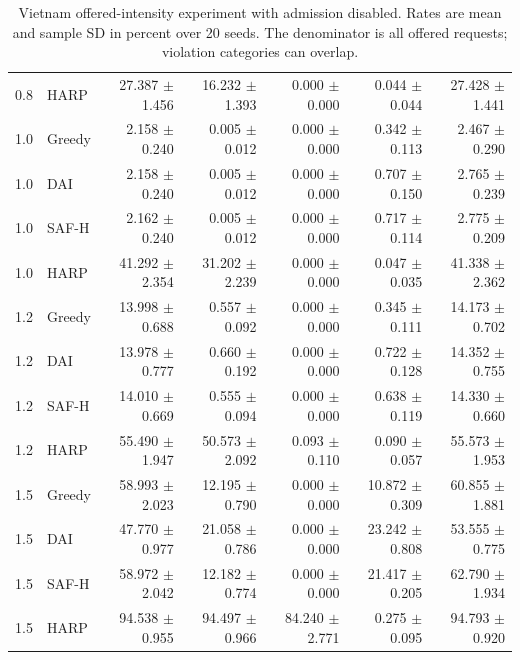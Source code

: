 \begin{table}[p]
\begin{tabular}{llrrrrr}
0.8 & HARP & 27.387 $\pm$ 1.456 & 16.232 $\pm$ 1.393 & 0.000 $\pm$ 0.000 & 0.044 $\pm$ 0.044 & 27.428 $\pm$ 1.441 \\
1.0 & Greedy & 2.158 $\pm$ 0.240 & 0.005 $\pm$ 0.012 & 0.000 $\pm$ 0.000 & 0.342 $\pm$ 0.113 & 2.467 $\pm$ 0.290 \\
1.0 & DAI & 2.158 $\pm$ 0.240 & 0.005 $\pm$ 0.012 & 0.000 $\pm$ 0.000 & 0.707 $\pm$ 0.150 & 2.765 $\pm$ 0.239 \\
1.0 & SAF-H & 2.162 $\pm$ 0.240 & 0.005 $\pm$ 0.012 & 0.000 $\pm$ 0.000 & 0.717 $\pm$ 0.114 & 2.775 $\pm$ 0.209 \\
1.0 & HARP & 41.292 $\pm$ 2.354 & 31.202 $\pm$ 2.239 & 0.000 $\pm$ 0.000 & 0.047 $\pm$ 0.035 & 41.338 $\pm$ 2.362 \\
1.2 & Greedy & 13.998 $\pm$ 0.688 & 0.557 $\pm$ 0.092 & 0.000 $\pm$ 0.000 & 0.345 $\pm$ 0.111 & 14.173 $\pm$ 0.702 \\
1.2 & DAI & 13.978 $\pm$ 0.777 & 0.660 $\pm$ 0.192 & 0.000 $\pm$ 0.000 & 0.722 $\pm$ 0.128 & 14.352 $\pm$ 0.755 \\
1.2 & SAF-H & 14.010 $\pm$ 0.669 & 0.555 $\pm$ 0.094 & 0.000 $\pm$ 0.000 & 0.638 $\pm$ 0.119 & 14.330 $\pm$ 0.660 \\
1.2 & HARP & 55.490 $\pm$ 1.947 & 50.573 $\pm$ 2.092 & 0.093 $\pm$ 0.110 & 0.090 $\pm$ 0.057 & 55.573 $\pm$ 1.953 \\
1.5 & Greedy & 58.993 $\pm$ 2.023 & 12.195 $\pm$ 0.790 & 0.000 $\pm$ 0.000 & 10.872 $\pm$ 0.309 & 60.855 $\pm$ 1.881 \\
1.5 & DAI & 47.770 $\pm$ 0.977 & 21.058 $\pm$ 0.786 & 0.000 $\pm$ 0.000 & 23.242 $\pm$ 0.808 & 53.555 $\pm$ 0.775 \\
1.5 & SAF-H & 58.972 $\pm$ 2.042 & 12.182 $\pm$ 0.774 & 0.000 $\pm$ 0.000 & 21.417 $\pm$ 0.205 & 62.790 $\pm$ 1.934 \\
1.5 & HARP & 94.538 $\pm$ 0.955 & 94.497 $\pm$ 0.966 & 84.240 $\pm$ 2.771 & 0.275 $\pm$ 0.095 & 94.793 $\pm$ 0.920 \\
\bottomrule
\end{tabular}
\caption{Vietnam offered-intensity experiment with admission disabled. Rates are mean and sample SD in percent over 20 seeds. The denominator is all offered requests; violation categories can overlap.}
\label{tab:load_sweep_unprotected}
\end{table}
